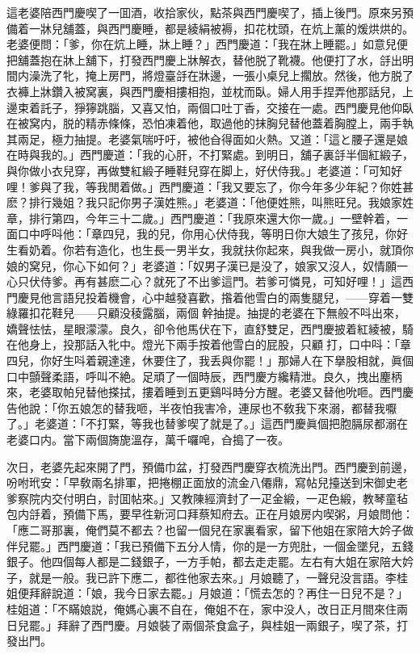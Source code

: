 這老婆陪西門慶喫了一囬酒，收拾家伙，點茶與西門慶喫了，插上後門。原來另預備着一牀兒舖蓋，與西門慶睡，都是綾絹被褥，扣花枕頭，在炕上薰的煖烘烘的。老婆便問：「爹，你在炕上睡，牀上睡？」西門慶道：「我在牀上睡罷。」如意兒便把舖蓋抱在牀上舖下，打發西門慶上牀解衣，替他脱了靴襪。他便打了水，㧱出明間内澡洗了牝，掩上房門，將燈臺㧱在牀邊，一張小桌兒上擱放。然後，他方脱了衣褲上牀鑽入被窝裏，與西門慶相摟相抱，並枕而臥。婦人用手捏弄他那話兒，上邊束着託子，猙獰跳腦，又喜又怕，兩個口吐丁香，交接在一處。西門慶見他仰臥在被窝内，脱的精赤條條，恐怕凍着他，取過他的抹胸兒替他蓋着胸膛上，兩手執其兩足，極力抽提。老婆氣喘吁吁，被他㒲得面如火熱。又道：「這と腰子還是娘在時與我的。」西門慶道：「我的心肝，不打緊處。到明日，舖子裏㧱半個紅緞子，與你做小衣兒穿，再做雙紅緞子睡鞋兒穿在脚上，好伏侍我。」老婆道：「可知好哩！爹與了我，等我閒着做。」西門慶道：「我又要忘了，你今年多少年紀？你姓甚麽？排行幾姐？我只記你男子漢姓熊。」老婆道：「他便姓熊，叫熊旺兒。我娘家姓章，排行第四，今年三十二歲。」西門慶道：「我原來還大你一歲。」一壁幹着，一面口中呼呌他：「章四兒，我的兒，你用心伏侍我，等明日你大娘生了孩兒，你好生看奶着。你若有造化，也生長一男半女，我就扶你起來，與我做一房小，就頂你娘的窝兒，你心下如何？」老婆道：「奴男子漢已是没了，娘家又沒人，奴情願一心只伏侍爹。再有甚麽二心？就死了不出爹這門。若爹可憐見，可知好哩！」這西門慶見他言語兒投着機會，心中越發喜歡，揝着他雪白的兩隻腿兒，——穿着一雙綠羅扣花鞋兒——只顧没稜露腦，兩個𢵞幹抽提。抽提的老婆在下無般不呌出來，嬌聲怯怯，星眼濛濛。良久，卻令他馬伏在下，直舒雙足，西門慶披着紅綾被，騎在他身上，投那話入牝中。燈光下兩手按着他雪白的屁股，只顧𢵞打，口中呌：「章四兒，你好生呌着親達達，休要住了，我丢與你罷！」那婦人在下擧股相就，眞個口中顫聲柔語，呼叫不絶。足頑了一個時辰，西門慶方纔精泄。良久，拽出麈柄來，老婆取帕兒替他搽拭，摟着睡到五更鷄呌時分方醒。老婆又替他吮咂。西門慶告他說：「你五娘怎的替我咂，半夜怕我害冷，連尿也不敎我下來溺，都替我嚈了。」老婆道：「不打緊，等我也替爹喫了就是了。」這西門慶眞個把胞膈尿都溺在老婆口内。當下兩個旖旎溫存，萬千囉唣，㒲搗了一夜。

次日，老婆先起來開了門，預備巾盆，打發西門慶穿衣梳洗出門。西門慶到前邊，吩咐玳安：「早敎兩名排軍，把捲棚正面放的流金八僊鼎，寫帖兒擡送到宋御史老爹察院内交付明白，討囬帖來。」又教陳經濟封了一疋金緞，一疋色緞，教琴童毡包内㧱着，預備下馬，要早徃新河口拜蔡知府去。正在月娘房内喫粥，月娘問他：「應二哥那裏，俺們莫不都去？也留一個兒在家裏看家，留下他姐在家陪大妗子做伴兒罷。」西門慶道：「我已預備下五分人情，你的是一方兜肚，一個金墜兒，五錢銀子。他四個每人都是二錢銀子，一方手帕，都去走走罷。左右有大姐在家陪大妗子，就是一般。我已許下應二，都徃他家去來。」月娘聽了，一聲兒没言語。李桂姐便拜辭說道：「娘，我今日家去罷。」月娘道：「慌去怎的？再住一日兒不是？」桂姐道：「不瞞娘説，俺媽心裏不自在，俺姐不在，家中没人，改日正月間來住兩日兒罷。」拜辭了西門慶。月娘裝了兩個茶食盒子，與桂姐一兩銀子，喫了茶，打發出門。

